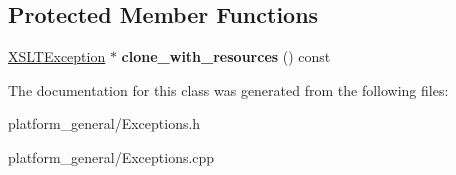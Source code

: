 \subsection*{\-Protected \-Member \-Functions}
\begin{DoxyCompactItemize}
\item 
\hypertarget{classgeneral__server_1_1XSLTException_a583307145da61ece9762cde8378cbb6a}{\hyperlink{classgeneral__server_1_1XSLTException}{\-X\-S\-L\-T\-Exception} $\ast$ {\bfseries clone\-\_\-with\-\_\-resources} () const }\label{classgeneral__server_1_1XSLTException_a583307145da61ece9762cde8378cbb6a}

\end{DoxyCompactItemize}


\-The documentation for this class was generated from the following files\-:\begin{DoxyCompactItemize}
\item 
platform\-\_\-general/\-Exceptions.\-h\item 
platform\-\_\-general/\-Exceptions.\-cpp\end{DoxyCompactItemize}
